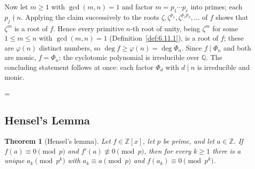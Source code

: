 \documentclass[11pt]{article}
\makeatletter
\theoremstyle{ntstyle}
\newtheorem{theorem}{Theorem}[subsection]
\let\nt@closedisplay\]
\def\nt@guardedclose{\@ifnextchar\par{\nt@closeafterpar}{\@ifnextchar\end{\postdisplaypenalty\@M\nt@closedisplay}{\nt@closedisplay}}}
\def\nt@closeafterpar\par{\@ifnextchar\par{\nt@closeafterpar}{\@ifnextchar\end{\postdisplaypenalty\@M\nt@closedisplay\par}{\nt@closedisplay\par}}}
\renewenvironment{proof}[1][\proofname]{\par
  \pushQED{\qed}\normalfont\topsep\medskipamount\edef\nt@afterproof{\@endparpenalty=\the\@endparpenalty\relax}\@beginparpenalty\@M\@endparpenalty\@M\let\]\nt@guardedclose\trivlist\item[]\textit{#1\@addpunct{.}} \ignorespaces}{\ifvmode\addpenalty\@M\fi\popQED\nt@afterproof\endtrivlist\@endpefalse}
\makeatother
\begin{document}
\begin{proof}
	Now let $m\ge1$ with $\gcd(m, n) = 1$ and factor $m = p_1\cdots p_r$
	into primes; each $p_j\nmid n$. Applying the claim successively to
	the roots $\zeta, \zeta^{p_1}, \zeta^{p_1p_2}, \ldots$ of $f$ shows
	that $\zeta^{m}$ is a root of $f$. Hence every primitive $n$-th root
	of unity, being $\zeta^{m}$ for some $1\le m\le n$ with $\gcd(m,n)=1$ (Definition~\ref{def:6.11.1}), is a root of $f$; these are $\varphi(n)$ distinct numbers, so $\deg f\ge\varphi(n) = \deg\Phi_n$.
	Since $f\mid\Phi_n$ and both are monic, $f = \Phi_n$: the cyclotomic
	polynomial is irreducible over $\mathbb{Q}$. The concluding
	statement follows at once: each factor $\Phi_d$ with $d\mid n$ is
	irreducible and monic.

\end{proof}
\subsection{Hensel's Lemma}

\begin{theorem}[Hensel's lemma]\label{thm:11.4.1} Let
	$f\in\mathbb{Z}[x]$, let $p$ be prime, and let $a\in\mathbb{Z}$. If
	$f(a)\equiv0\pmod{p}$ and
	$f'(a)\not\equiv0\pmod{p}$, then for every $k\ge1$ there is a unique
	$a_k\pmod{p^k}$ with $a_k\equiv a\pmod{p}$ and $f(a_k)\equiv0\pmod{p^k}$.

\end{theorem}
\end{document}
